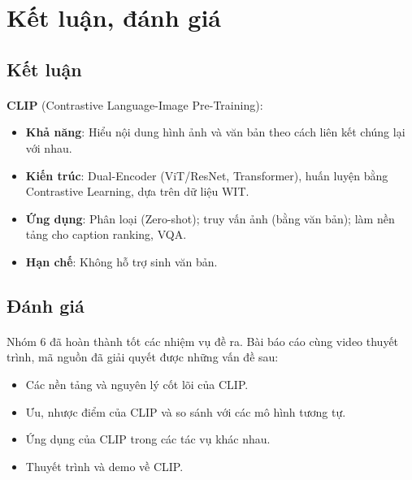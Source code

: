 \newpage
\section{Kết luận, đánh giá}

\subsection{Kết luận}
\paragraph{}{\textbf{CLIP} (Contrastive Language-Image Pre-Training):}
\begin{itemize}
    \item \textbf{Khả năng}: Hiểu nội dung hình ảnh và văn bản theo cách liên kết chúng lại với nhau.
    \item \textbf{Kiến trúc}: Dual-Encoder (ViT/ResNet, Transformer), huấn luyện bằng Contrastive Learning, dựa trên dữ liệu WIT.
    \item \textbf{Ứng dụng}: Phân loại (Zero-shot); truy vấn ảnh (bằng văn bản); làm nền tảng cho
caption ranking, VQA.
    \item \textbf{Hạn chế}: Không hỗ trợ sinh văn bản.
\end{itemize}

\subsection{Đánh giá}

\paragraph{}{Nhóm 6 đã hoàn thành tốt các nhiệm vụ đề ra. Bài báo cáo cùng video thuyết trình, mã nguồn đã giải quyết được những vấn đề sau:}

\begin{itemize}
    \item Các nền tảng và nguyên lý cốt lõi của CLIP.
    \item Ưu, nhược điểm của CLIP và so sánh với các mô hình tương tự.
    \item Ứng dụng của CLIP trong các tác vụ khác nhau.
    \item Thuyết trình và demo về CLIP.
\end{itemize}